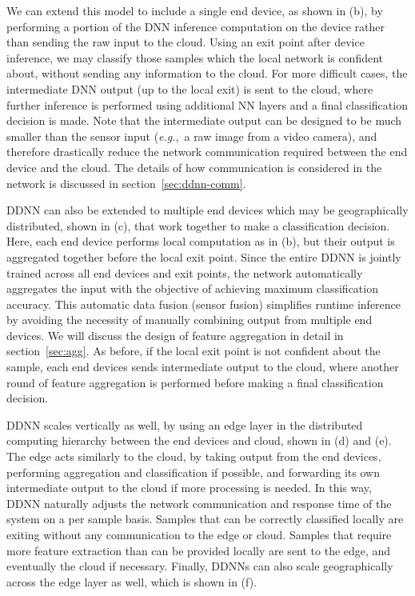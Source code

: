 \documentclass[10pt, conference, compsocconf]{IEEEtran}
\newcommand{\eg}{\emph{e.g.}}
\begin{document}
We can extend this model to include a single end device, as shown in (b), by performing a portion of the DNN inference computation on the device rather than sending the raw input to the cloud. Using an exit point after device inference, we may classify those samples which the local network is confident about, without sending any information to the cloud. For more difficult cases, the intermediate DNN output (up to the local exit) is sent to the cloud, where further inference is performed using additional NN layers and a final classification decision is made. Note that the intermediate output can be designed to be much smaller than the sensor input (\eg,~a raw image from a video camera), and therefore drastically reduce the network communication required between the end device and the cloud. The details of how communication is considered in the network is discussed in section~\ref{sec:ddnn-comm}.

DDNN can also be extended to multiple end devices which may be geographically distributed, shown in (c), that work together to make a classification decision. Here, each end device performs local computation as in (b), but their output is aggregated together before the local exit point. Since the entire DDNN is jointly trained across all end devices and exit points, the network automatically aggregates the input with the objective of achieving maximum classification accuracy. This automatic data fusion (sensor fusion) simplifies runtime inference by avoiding the necessity of manually combining output from multiple end devices. We will discuss the design of feature aggregation in detail in section~\ref{sec:agg}. As before, if the local exit point is not confident about the sample, each end devices sends intermediate output to the cloud, where another round of feature aggregation is performed before making a final classification decision.

DDNN scales vertically as well, by using an edge layer in the distributed computing hierarchy between the end devices and cloud, shown in (d) and (e). The edge acts similarly to the cloud, by taking output from the end devices, performing aggregation and classification if possible, and forwarding its own intermediate output to the cloud if more processing is needed. In this way, DDNN naturally adjusts the network communication and response time of the system on a per sample basis. Samples that can be correctly classified locally are exiting without any communication to the edge or cloud. Samples that require more feature extraction than can be provided locally are sent to the edge, and eventually the cloud if necessary. Finally, DDNNs can also scale geographically across the edge layer as well, which is shown in (f).
\end{document}
